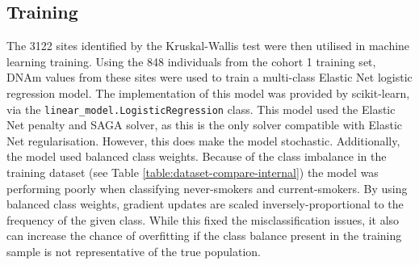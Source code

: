 \documentclass[draft]{article} %
\begin{document}

\subsection{Training} \label{sec:training}

The \num{3122} sites identified by the Kruskal-Wallis test were then utilised in machine learning training. Using the 848 individuals from the cohort 1 training set, DNAm values from these sites were used to train a multi-class Elastic Net logistic regression model. The implementation of this model was provided by scikit-learn, via the \verb|linear_model.LogisticRegression| class. This model used the Elastic Net penalty and SAGA solver, as this is the only solver compatible with Elastic Net regularisation. However, this does make the model stochastic. Additionally, the model used balanced class weights. Because of the class imbalance in the training dataset (see Table \ref{table:dataset-compare-internal}) the model was performing poorly when classifying never-smokers and current-smokers. By using balanced class weights, gradient updates are scaled inversely-proportional to the frequency of the given class. While this fixed the misclassification issues, it also can increase the chance of overfitting if the class balance present in the training sample is not representative of the true population.
\end{document}
